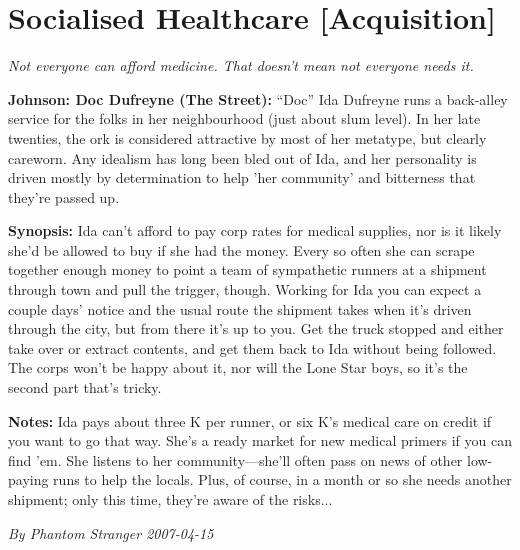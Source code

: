 \documentclass[letterpaper,twocolumn,10.5pt]{article}
\newenvironment{scenario}[6]
	{
		\section{#1 {\small[#2]}}
		\textit{#3}
		\def\TMPSCENARIO{#4 #5}
	}
	{\small\textit{By \TMPSCENARIO}}
\newcommand{\johnson}[2]{\textbf{Johnson: #1 (#2):}}
\newcommand{\synopsis}{\textbf{Synopsis: }}
\newcommand{\notes}{\textbf{Notes: }}
\begin{document}
\begin{scenario}{Socialised Healthcare}
	{Acquisition}
	{Not everyone can afford medicine. That doesn't mean not everyone needs it.}
	{Phantom Stranger}
	{2007-04-15}
	{https://forum.rpg.net/showthread.php?321504-Shadowrun-4th-101-Instant-Scenarios\&p=7172198#post7172198}

\johnson{Doc Dufreyne}{The Street} ``Doc'' Ida Dufreyne runs a back-alley service for the folks in her neighbourhood (just about slum level). In her late twenties, the ork is considered attractive by most of her metatype, but clearly careworn. Any idealism has long been bled out of Ida, and her personality is driven mostly by determination to help 'her community' and bitterness that they're passed up.

\synopsis Ida can't afford to pay corp rates for medical supplies, nor is it likely she'd be allowed to buy if she had the money. Every so often she can scrape together enough money to point a team of sympathetic runners at a shipment through town and pull the trigger, though. Working for Ida you can expect a couple days' notice and the usual route the shipment takes when it's driven through the city, but from there it's up to you. Get the truck stopped and either take over or extract contents, and get them back to Ida without being followed. The corps won't be happy about it, nor will the Lone Star boys, so it's the second part that's tricky.

\notes Ida pays about three K per runner, or six K's medical care on credit if you want to go that way. She's a ready market for new medical primers if you can find 'em. She listens to her community---she'll often pass on news of other low-paying runs to help the locals. Plus, of course, in a month or so she needs another shipment; only this time, they're aware of the risks... 

\end{scenario}
\end{document}
